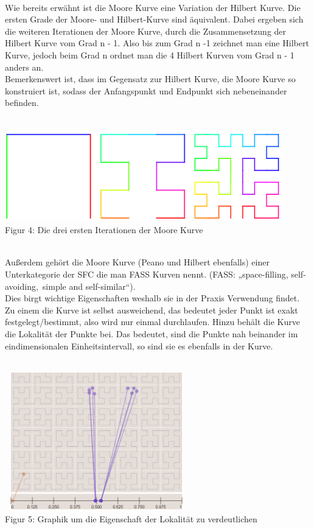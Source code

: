 \documentclass[course=erap]{aspdoc}
\begin{document}
\	\\
\newpage %
Wie bereits erwähnt ist die Moore Kurve eine Variation der Hilbert Kurve. Die ersten Grade der Moore- und Hilbert-Kurve sind äquivalent. Dabei ergeben sich die weiteren Iterationen der Moore Kurve, durch die Zusammensetzung der Hilbert Kurve vom Grad n - 1.  Also bis zum Grad n -1 zeichnet man eine Hilbert Kurve, jedoch beim Grad n ordnet man die 4 Hilbert Kurven vom Grad n - 1 anders an.\\ %
Bemerkenswert ist, dass im Gegensatz zur Hilbert Kurve, die Moore Kurve so konstruiert ist, sodass der Anfangspunkt und Endpunkt sich nebeneinander befinden.
\\
\\
\begin{center}
	\includegraphics[width=12cm, height=4cm]{Moore}\\	%
	\tiny Figur 4: Die drei ersten Iterationen der Moore Kurve
\end{center}
\	\\
Außerdem gehört die Moore Kurve (Peano und Hilbert ebenfalls) einer Unterkategorie der SFC die man FASS Kurven nennt. (FASS: „space-filling, self-avoiding, simple and self-similar“).\\
Dies birgt wichtige Eigenschaften weshalb sie in der Praxis Verwendung findet. Zu einem die Kurve ist selbst ausweichend, das bedeutet jeder Punkt ist exakt festgelegt/bestimmt, also wird nur einmal durchlaufen. Hinzu behält die Kurve die Lokalität der Punkte bei. Das bedeutet, sind die Punkte nah beinander im eindimensionalen Einheitsintervall, so sind sie es ebenfalls in der Kurve. %
\\
\\
\begin{center}
	\includegraphics[width=8cm, height=6cm]{Locality}\\	%
	\tiny Figur 5: Graphik um die Eigenschaft der Lokalität zu verdeutlichen %
\end{center} %
\end{document}
